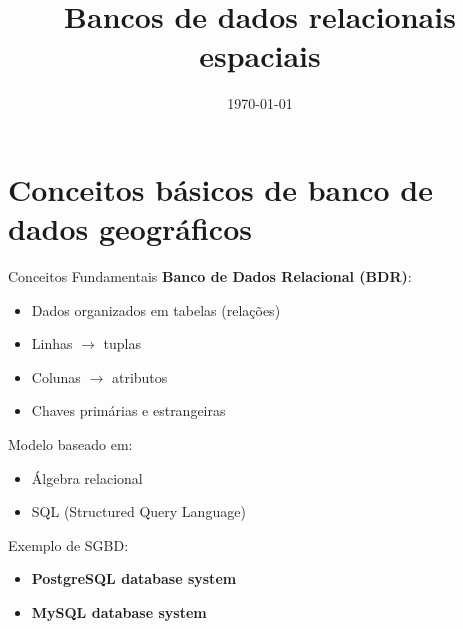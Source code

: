 \documentclass{beamer}
\title{Bancos de dados relacionais espaciais}
\date{\today}
\begin{document}
    


\section{Conceitos básicos de banco de dados geográficos}
\begin{frame}{Conceitos Fundamentais}
    \textbf{Banco de Dados Relacional (BDR)}:
    
    \begin{itemize}
        \item Dados organizados em tabelas (relações)
        \item Linhas $\rightarrow$ tuplas
        \item Colunas $\rightarrow$ atributos
        \item Chaves primárias e estrangeiras
    \end{itemize}
    
    \vspace{0.4cm}
    
    Modelo baseado em:
    \begin{itemize}
        \item Álgebra relacional
        \item SQL (Structured Query Language)
    \end{itemize}
    
    \vspace{0.4cm}
    
    Exemplo de SGBD:
    \begin{itemize}
        \item \textbf{{PostgreSQL} {database system}} 
        \item \textbf{{MySQL} {database system}}
    \end{itemize}
\end{frame}
\end{document}
